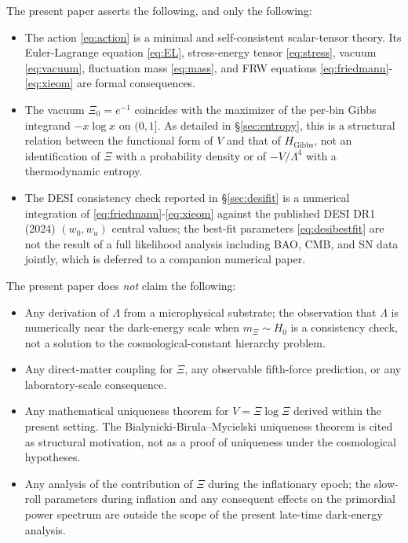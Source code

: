 \documentclass[11pt,reqno]{amsart}
\theoremstyle{plain}
\theoremstyle{definition}
\theoremstyle{remark}
\newcommand{\Gibbs}{\mathrm{Gibbs}}
\begin{document}
The present paper asserts the following, and only the following:
\begin{itemize}
  \item The action \eqref{eq:action} is a minimal and self-consistent
        scalar-tensor theory. Its Euler-Lagrange equation \eqref{eq:EL},
        stress-energy tensor \eqref{eq:stress}, vacuum \eqref{eq:vacuum},
        fluctuation mass \eqref{eq:mass}, and FRW equations
        \eqref{eq:friedmann}-\eqref{eq:xieom} are formal consequences.
  \item The vacuum $\Xi_0 = e^{-1}$ coincides with the maximizer of the
        per-bin Gibbs integrand $-x\log x$ on $(0,1]$. As detailed in
        \S\ref{sec:entropy}, this is a structural relation between
        the functional form of $V$ and that of $H_{\Gibbs}$, not an
        identification of $\Xi$ with a probability density or of
        $-V/\Lambda^{4}$ with a thermodynamic entropy.
  \item The DESI consistency check reported in \S\ref{sec:desifit} is a
        numerical integration of \eqref{eq:friedmann}-\eqref{eq:xieom}
        against the published DESI DR1 (2024) $(w_0, w_a)$ central
        values; the best-fit parameters \eqref{eq:desibestfit} are not
        the result of a full likelihood analysis including BAO, CMB,
        and SN data jointly, which is deferred to a companion numerical
        paper.
\end{itemize}

The present paper does \emph{not} claim the following:
\begin{itemize}
  \item Any derivation of $\Lambda$ from a microphysical substrate; the
        observation that $\Lambda$ is numerically near the dark-energy
        scale when $m_\Xi \sim H_0$ is a consistency check, not a
        solution to the cosmological-constant hierarchy problem.
  \item Any direct-matter coupling for $\Xi$, any observable fifth-force
        prediction, or any laboratory-scale consequence.
  \item Any mathematical uniqueness theorem for $V = \Xi\log\Xi$
        derived within the present setting. The Bialynicki-Birula--Mycielski
        uniqueness theorem \cite{BialynickiBirulaMycielski1976} is cited
        as structural motivation, not as a proof of uniqueness under
        the cosmological hypotheses.
  \item Any analysis of the contribution of $\Xi$ during the
        inflationary epoch; the slow-roll parameters during inflation
        and any consequent effects on the primordial power spectrum are
        outside the scope of the present late-time dark-energy analysis.
\end{itemize}
\end{document}
